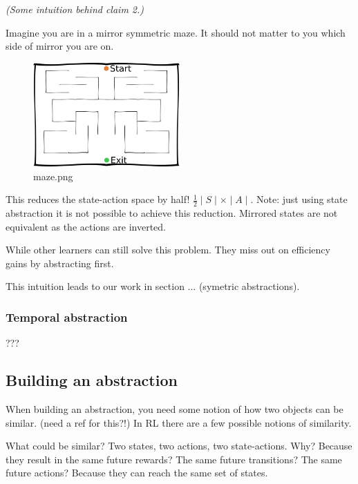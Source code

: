 \emph{(Some intuition behind claim 2.)}

Imagine you are in a mirror symmetric maze. It should not matter to you
which side of mirror you are on.

\begin{figure}[hb!]
\centering
\includegraphics[width=0.5\textwidth,height=0.5\textheight]{../../pictures/drawings/maze.png}
\caption{maze.png}
\end{figure}

This reduces the state-action space by half!
\(\frac{1}{2}\mid S \mid \times \mid A \mid\). Note: just using state
abstraction it is not possible to achieve this reduction. Mirrored
states are not equivalent as the actions are inverted.

While other learners can still solve this problem. They miss out on
efficiency gains by abstracting first.

This intuition leads to our work in section ... (symetric abstractions).

\subsubsection{Temporal abstraction}

???


\subsection{Building an abstraction}


When building an abstraction, you need some notion of how two objects can be similar. (need a ref for this?!)
In RL there are a few possible notions of similarity.

What could be similar? Two states, two actions, two state-actions. Why?
Because they result in the same future rewards? The same future transitions? The same future actions?
Because they can reach the same set of states.

